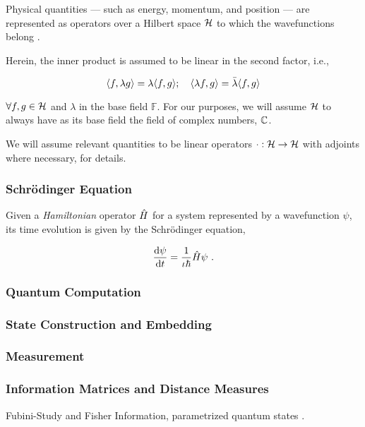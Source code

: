 Physical quantities --- such as energy, momentum, and position --- are
represented as operators over a Hilbert space \(\mathcal{H}\) to which the
wavefunctions belong \cite{hall2013quantum}. 

Herein, the inner product is assumed to be linear in the second factor, i.e.,

\begin{equation*}
    \langle f, \lambda g\rangle = \lambda \langle f, g\rangle; \quad \langle \lambda f, g\rangle = \bar{\lambda} \langle f, g\rangle
\end{equation*}

\(\forall f, g \in \mathcal{H}\) and \(\lambda\) in the base field
\(\mathbb{F}\). For our purposes, we will assume \(\mathcal{H}\) to always
have as its base field the field of complex numbers, \(\mathbb{C}\).

We will assume relevant quantities to be linear operators \(\cdot :
\mathcal{H} \to \mathcal{H}\) with adjoints where necessary,
\cite[see][Appendix A]{hall2013quantum} for details.

\subsubsection{Schr\"odinger Equation}
Given a \emph{Hamiltonian} operator \(\hat{H}\) for a system represented by
a wavefunction \(\psi\), its time evolution is given by the Schr\"odinger
equation,

\begin{equation}
    \frac{\dd{\psi}}{\dd{t}} = \frac{1}{\iota\hbar} \hat{H} \psi~.
    \label{eq:schrodinger}
\end{equation}

\subsubsection{Quantum Computation}

\subsubsection{State Construction and Embedding}

\subsubsection{Measurement}

\subsubsection{Information Matrices and Distance Measures}
\label{subsubsec:distanceinfo}

Fubini-Study and Fisher Information, parametrized quantum states
\cite{meyer2021fisher}.